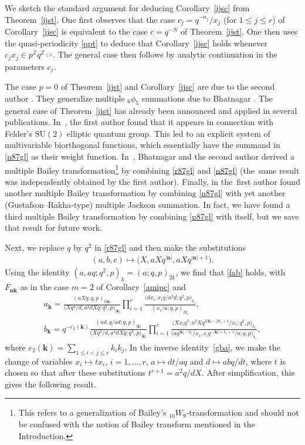 \documentclass[pdftex]{sigma}%
\numberwithin{equation}{section}
\newcommand\bn{\mathbf n}
\newcommand\bk{\mathbf k}
\begin{document}
We sketch the standard argument for deducing
Corollary~\ref{ijsc} from Theorem~\ref{ijst}. One first observes that the case $c_j=q^{-n_j}/x_j$ (for $1\leq j\leq r$) of Corollary~\ref{ijsc} is equivalent to the case $c=q^{-N}$ of Theorem~\ref{ijst}. One then uses the quasi-periodicity \eqref{qpt} to deduce that Corollary~\ref{ijsc} holds whenever $c_jx_j\in p^{\mathbb Z}q^{\mathbb Z_{\leq 0}}$. The general case then follows by analytic continuation in the parameters $c_j$.

The case $p=0$ of Theorem~\ref{ijst} and Corollary~\ref{ijsc} are due to the second author \cite[Theorem~4.1, Corollary~4.2]{s4}. They
generalize multiple ${}_6\phi_5$ summations due to
Bhatnagar \cite{b}.
The general case of Theorem~\ref{ijst} has already been announced and applied in several publications.
In~\cite{r3}, the first author found that it appears in connection with Felder's $\mathrm{SU}(2)$ elliptic quantum group. This led to an explicit system of multivariable biorthogonal functions, which essentially have the summand in \eqref{n87gl} as their weight function. In~\cite[Theorem~5.2]{bs}, Bhatnagar and the second author derived a multiple Bailey transformation\footnote{This refers to a generalization of
Bailey's ${}_{10}W_9$-transformation and should not be confused with the notion of Bailey transform mentioned in the Introduction.} by combining \eqref{r87gl} and \eqref{n87gl}
(the~same result was independently obtained by the first author). Finally, in \cite[Theorem~4.1]{r4} the~first author found another multiple Bailey transformation by combining \eqref{n87gl}
with yet ano\-ther (Gustafson--Rakha-type) multiple Jackson summation.
In fact, we have found a third multiple Bailey transformation
by combining \eqref{n87gl} with itself, but we save that result for future work.

Next, we replace $q$ by $q^2$ in \eqref{r87gl} and then make
the substitutions
\begin{gather*}
(a,b,c)\mapsto \big(X,aXq^{|\bn|},aXq^{|\bn|+1}\big).
\end{gather*}
Using the identity $(a,aq;q^2,p)_k=(a;q,p)_{2k}$,
we find that
 \eqref{fab} holds, with $F_{\bn\bk}$ as in the case $m=2$ of Corollary~\ref{amipc} and
\begin{gather*}
a_{\bk}=\frac{(aXq;q,p)_{2|\bk|}}{\big(Xq^2/d,a^2dXq;q^2,p\big)_{|\bk|}}
\prod\limits_{i=1}^r\frac{\big(dx_i,x_iq/a^2d;q^2,p\big)_{k_i}}{(x_i/a;q,p)_{2k_i}},
\\
b_{\bk}=q^{-e_2(\bk)}\frac{(ad,q/ad;q,p)_{|\bk|}}{\big(Xq^2/d,a^2 d Xq;q^2,p\big)_{|\bk|}}
\prod\limits_{i=1}^r\frac{\big(X x_iq^2,a^2 Xq^{2|\bk|-2k_i+1}/x_i;q^2,p\big)_{k_i}}{\big(aq^{|\bk|-k_i}/x_i,x_iq^{-|\bk|+k_i+1}/a;q,p\big)_{k_i}},
\end{gather*}
where $e_2(\mathbf k)=\sum_{1\leq i<j\leq r}k_ik_j$.
 In the inverse identity~\eqref{gba}, we make the change of variables $x_i\mapsto tx_i$, $i=1,\dots,r$,
$a\mapsto dt/aq$ and $d\mapsto abq/dt$, where $t$ is chosen so that after these substitutions
$t^{r+1}=a^2q/dX$. After simplification, this gives the following result.
\end{document}
